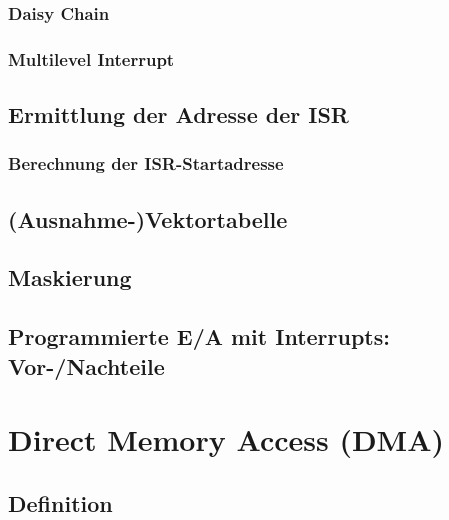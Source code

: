 \subsubsection{Daisy Chain}

\subsubsection{Multilevel Interrupt}

\subsection{Ermittlung der Adresse der ISR}
\subsubsection{Berechnung der ISR-Startadresse}

\subsection{(Ausnahme-)Vektortabelle}


\subsection{Maskierung}


\subsection{Programmierte E/A mit Interrupts: Vor-/Nachteile}


\section{Direct Memory Access (DMA)}
\subsection{Definition}

